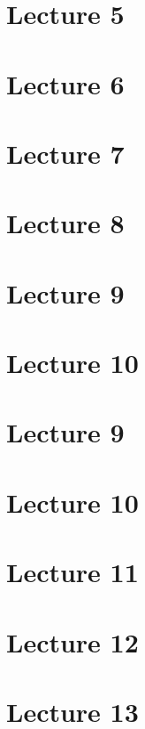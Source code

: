 \section*{Lecture 5}
\section*{Lecture 6}
\section*{Lecture 7}
\section*{Lecture 8}
\section*{Lecture 9}
\section*{Lecture 10}
\section*{Lecture 9}
\section*{Lecture 10}
\section*{Lecture 11}
\section*{Lecture 12}
\section*{Lecture 13}
